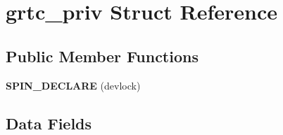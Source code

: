\hypertarget{structgrtc__priv}{}\section{grtc\+\_\+priv Struct Reference}
\label{structgrtc__priv}
\subsection*{Public Member Functions}
\begin{DoxyCompactItemize}
\item 
\mbox{\label{structgrtc__priv_ac2fea06dbd2e41738aa7a688a0537da0}} 
{\bfseries S\+P\+I\+N\+\_\+\+D\+E\+C\+L\+A\+RE} (devlock)
\end{DoxyCompactItemize}
\subsection*{Data Fields}
